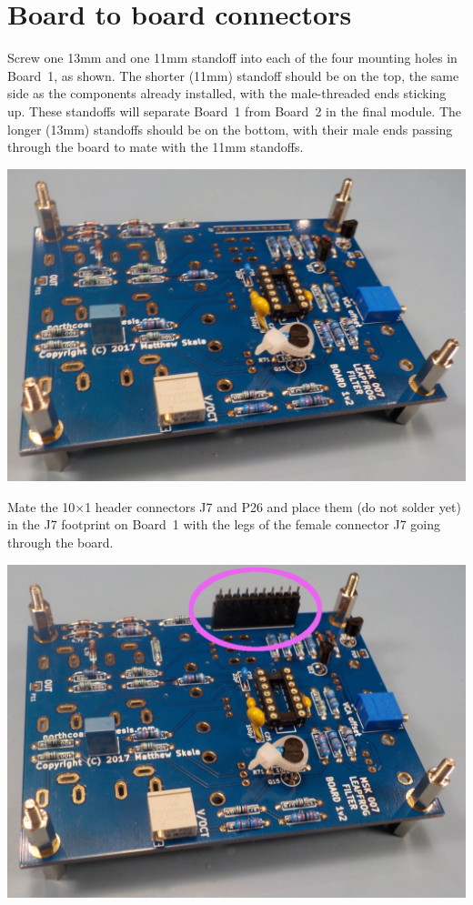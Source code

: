 \pagebreak

\section{Board to board connectors}

Screw one 13mm and one 11mm standoff into each of the four mounting holes in
Board~1, as shown.  The shorter (11mm) standoff should be on the top, the
same side as the components already installed, with the male-threaded ends
sticking up.  These standoffs will separate Board~1 from Board~2 in the
final module.  The longer (13mm) standoffs should be on the bottom, with
their male ends passing through the board to mate with the 11mm standoffs.

\nopagebreak
\noindent\includegraphics[width=\linewidth]{board12-stack-1.jpg}

Mate the 10$\times$1 header connectors J7 and P26 and place them (do not
solder yet) in the J7 footprint on Board~1 with the legs of the female
connector J7 going through the board.

\nopagebreak
\noindent\includegraphics[width=\linewidth]{board12-stack-2.jpg}

